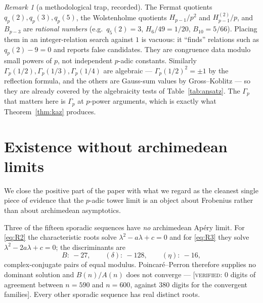 \documentclass[11pt,reqno]{article}
\newcommand{\Gp}{\Gamma_p}
\newcommand{\VER}[1]{{\normalfont\textsc{[verified:} #1\textsc{]}}}
\theoremstyle{plain}
\theoremstyle{definition}
\theoremstyle{remark}
\newtheorem{remark}[theorem]{Remark}
\numberwithin{equation}{section}
\begin{document}
\begin{remark}[a methodological trap, recorded]\label{rem:trap}
The Fermat quotients $q_p(2),q_p(3),q_p(5)$, the Wolstenholme quotients
$H_{p-1}/p^2$ and $H^{(2)}_{p-1}/p$, and $B_{p-3}$ are \emph{rational numbers}
(e.g.\ $q_5(2)=3$, $H_6/49=1/20$, $B_{10}=5/66$).  Placing them in an
integer-relation search against $1$ is vacuous: it ``finds'' relations such as
$q_p(2)-9=0$ and reports false candidates.  They are congruence data modulo
small powers of $p$, not independent $p$-adic constants.  Similarly
$\Gp(1/2),\Gp(1/3),\Gp(1/4)$ are algebraic --- $\Gp(1/2)^2=\pm1$ by the
reflection formula, and the others are Gauss-sum values by Gross--Koblitz
\cite{GrossKoblitz1979} --- so they are already covered by the
algebraicity tests of Table~\ref{tab:ansatz}.  The $\Gp$ that matters here is
$\Gp$ at $p$-power arguments, which is exactly what Theorem~\ref{thm:kaz}
produces.
\end{remark}

\section{Existence without archimedean limits}\label{sec:noarch}

We close the positive part of the paper with what we regard as the cleanest
single piece of evidence that the $p$-adic tower limit is an object about
Frobenius rather than about archimedean asymptotics.

Three of the fifteen sporadic sequences have \emph{no} archimedean Ap\'ery
limit.  For \eqref{eq:R2} the characteristic roots solve
$\lambda^2-a\lambda+c=0$ and for \eqref{eq:R3} they solve
$\lambda^2-2a\lambda+c=0$; the discriminants are
\[
  B:\ -27,\qquad (\delta):\ -128,\qquad (\eta):\ -16,
\]
complex-conjugate pairs of equal modulus.  Poincar\'e--Perron therefore supplies
no dominant solution and $B(n)/A(n)$ does not converge --- \VER{$0$ digits of
agreement between $n=590$ and $n=600$, against $380$ digits for the convergent
families}.  Every other sporadic sequence has real distinct roots.
\end{document}
